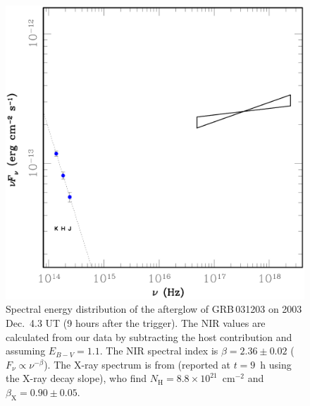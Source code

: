 \documentclass{emulateapj}
\newcommand{\ped}[2]{#1_\mathrm{#2}}
\begin{document}
\begin{figure}\centering
  \includegraphics[width=\columnwidth,keepaspectratio]{SED_nuFnu.ps}
  \caption{Spectral energy distribution of the afterglow of GRB\,031203
  on 2003 Dec.~4.3 UT (9 hours after the trigger). The NIR values are
  calculated from our data by subtracting the host contribution and
  assuming $E_{B-V} = 1.1$. The NIR spectral index is $\beta = 2.36 \pm
  0.02$ ($F_\nu \propto \nu^{-\beta}$). The X-ray spectrum is from
  \citet{Wa04} (reported at $t = 9$~h using the X-ray decay slope), who
  find $\ped{N}{H} = 8.8 \times 10^{21}$~cm$^{-2}$ and $\ped{\beta}{X} =
  0.90 \pm 0.05$.\label{fg:SED}}
\end{figure}
\end{document}
